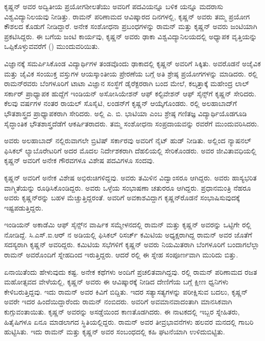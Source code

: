 ಕೃಷ್ಣನ್ ಅವರ ಅದ್ವಿತೀಯ ಪ್ರಯೋಗಶೀಲತೆಯು ಅವರಿಗೆ  ಪದವಿಯನ್ನೂ ಬಳಿಕ  ಯನ್ನೂ ಮದರಾಸು ವಿಶ್ವವಿದ್ಯಾನಿಲಯವು ನೀಡಿತ್ತು. ರಾಮನ್ ಪರಿಣಾಮದ ಆವಿಷ್ಕಾರದ ದಿನಗಳಲ್ಲಿ, ಕೃಷ್ಣನ್ ಅವರು ತಮ್ಮ ಪ್ರಯೋಗ ಕೌಶಲದ ಕೊಡುಗೆ ನೀಡಿದ್ದಾರೆ. ಅನೇಕ ಸಂಶೋಧನಾ ಪ್ರಬಂಧಗಳನ್ನು ರಾಮನ್ ಮತ್ತು ಕೃಷ್ಣನ್ ಅವರು ಜಂಟಿಯಾಗಿ ಪ್ರಕಟಿಸಿದ್ದರು. ಈ ಬಗೆಯ ಜಂಟಿ ಕಾರ್ಯವು, ಕೃಷ್ಣನ್ ಅವರು ಢಾಕಾ ವಿಶ್ವವಿದ್ಯಾನಿಲಯದಲ್ಲಿ ಅಧ್ಯಾಪಕ ವೃತ್ತಿಯನ್ನು ಒಪ್ಪಿಕೊಳ್ಳುವವರೆಗೆ () ಮುಂದುವರಿಯಿತು.

ವಿಜ್ಞಾನಕ್ಕೆ ಸಮರ್ಪಿಸಿಕೊಂಡ ವಿದ್ಯಾರ್ಥಿಗಳ ತಂಡವೊಂದು ಢಾಕಾದಲ್ಲಿ ಕೃಷ್ಣನ್ ಅವರಿಗೆ ಸಿಕ್ಕಿತು. ಅವರೊಡನೆ ಅಜೈವಿಕ ಮತ್ತು ಜೈವಿಕ ಸಂಯುಕ್ತ ವಸ್ತುಗಳ ಆಯಸ್ಕಾಂತೀಯ ಪ್ರೇರಣೆಯ ಬಗ್ಗೆ ಅತಿ ಶ್ರೇಷ್ಠ ಪ್ರಯೋಗಗಳನ್ನು ಮಾಡಿದರು. ರಲ್ಲಿ ರಾಮನ್‍ರವರು ಬೆಂಗಳೂರಿಗೆ ಟಾಟಾ ವಿಜ್ಞಾನ ಸಂಸ್ಥೆಗೆ ಡೈರೆಕ್ಟರರಾಗಿ ಬಂದ ಮೇಲೆ, ಕಲ್ಕತ್ತಾಕ್ಕೆ ಮಹೇಂದ್ರ ಲಾಲ್ ಸರ್ಕಾರ್ ಪ್ರಾಧ್ಯಾಪಕ ಹುದ್ದೆಗೆ ಇಂಡಿಯನ್ ಅಸೋಸಿಯೇಶನ್ ಆಫ್ ಕಲ್ಟಿವೇಶನ್ ಆಫ್ ಸೈನ್ಸ್‌ಗೆ ಕೃಷ್ಣನ್ ಸೇರಿದರು. ಕೆಲವು ವರ್ಷಗಳ ನಂತರ ರಾಯಲ್ ಸೊಸೈಟಿ, ಲಂಡನ್‍ಗೆ ಕೃಷ್ಣನ್ ಆಯ್ಕೆಗೊಂಡರು. ರಲ್ಲಿ ಅಲಹಾಬಾದ್‍ಗೆ ಭೌತಶಾಸ್ತ್ರದ ಪ್ರಾಧ್ಯಾಪಕರಾಗಿ ಸೇರಿದರು. ಅಲ್ಲಿ ಎ. ಬಿ. ಭಾಟಿಯಾ ಎಂಬ ಶ್ರೇಷ್ಠ ಗಣಿತಜ್ಞ ವಿದ್ಯಾರ್ಥಿಯೊಡಗೂಡಿ ಸೈದ್ಧಾಂತಿಕ ಭೌತಶಾಸ್ತ್ರದೆಡೆಗೆ ಆಕರ್ಷಿತರಾದರು. ತಮ್ಮ ಸಂಶೋಧನಾ ಸಂಪ್ರದಾಯವನ್ನು ರವರೆಗೆ ಮುಂದುವರಿಸಿದರು.

ಅವರು ಅಲಹಾಬಾದ್ ನಲ್ಲಿರುವಾಗಲೇ ಬ್ರಿಟಿಷ್ ಸರ್ಕಾರವು ಅವರಿಗೆ ನೈಟ್ ಹುಡ್ ನೀಡಿತು. ಅಲ್ಲಿಂದ ನ್ಯಾಷನಲ್ ಫಿಸಿಕಲ್ ಲ್ಯಾಬೊರೇಟರಿಗೆ ಅದರ ಮೊದಲ ನಿರ್ದೇಶಕರಾಗಿ ದೆಹಲಿಯಲ್ಲಿ ಸೇರಿಕೊಂಡರು. ಅವರ ಜೀವಿತಾವಧಿಯಲ್ಲಿ ಕೃಷ್ಣನ್ ಅವರಿಗೆ ಅನೇಕ ಗೌರವಗಳೂ ವಿಶೇಷ ಪದವಿಗಳೂ ಸಂದವು.

ಕೃಷ್ಣನ್ ಅವರಿಗೆ ಅನೇಕ ವಿಶೇಷ ಅಭಿರುಚಿಗಳಿದ್ದವು. ಅವರು ತಮಿಳಿನ ವಿದ್ವಾಂಸರೂ ಆಗಿದ್ದರು. ಅವರು ಹಾಸ್ಯಭರಿತ ವಾಗ್ಮಿತೆಯನ್ನು ರೂಢಿಸಿಕೊಂಡಿದ್ದರು. ಅವರು ಒಳ್ಳೆಯ ಸಂಭಾಷಣಾ ಚತುರರೂ ಆಗಿದ್ದರು. ಪ್ರಧಾನಮಂತ್ರಿ ನೆಹರೂ ಅವರು ಕೃಷ್ಣನ್‍ರನ್ನು ಬಹಳ ಮೆಚ್ಚುತ್ತಿದ್ದರಂತೆ. ಅವರಿಗೆ ಅವಕಾಶವಿದ್ದಾಗ ಕೃಷ್ಣನ್‍ರೊಡನೆ ಸಂಭಾಷಿಸುವುದಕ್ಕೆ ಇಷ್ಟಪಡುತ್ತಿದ್ದರು.

ಇಂಡಿಯನ್ ಅಕಾಡೆಮಿ ಆಫ್ ಸೈನ್ಸ್‌ನ ವಾರ್ಷಿಕ ಸಮ್ಮೇಳನದಲ್ಲಿ ರಾಮನ್ ಮತ್ತು ಕೃಷ್ಣನ್ ಅವರನ್ನು ಒಟ್ಟಿಗೇ ರಲ್ಲಿ ನೋಡಿದ್ದೆ. ಸಿ.ಎಸ್.ಐ.ಆರ್ ನ ಅಡಿಯಲ್ಲಿ ಫಿಸಿಕಲ್ ರಿಸರ್ಚ್ ಕಮಿಟಿಯ ಅಧ್ಯಕ್ಷರಾಗಿದ್ದ ರಾಮನ್ ಅವರ ಜೊತೆಗೆ ಸದಸ್ಯರಾಗಿ ಕೃಷ್ಣನ್ ಅವರಿದ್ದರು. ಕಮಿಟಿಯ ಸಭೆಗಳಿಗೆ ಕೃಷ್ಣನ್ ಅವರು ನಿಯಮಿತರಾಗಿ ಬೆಂಗಳೂರಿಗೆ ಬಂದಾಗಲೆಲ್ಲಾ ರಾಮನ್ ಅವರೊಂದಿಗೆ ಸ್ನೇಹದಿಂದ ಇರುತ್ತಿದ್ದರು. ಆದರೆ ರಲ್ಲಿ ಈ ಸ್ನೇಹ ಸಂಪೂರ್ಣವಾಗಿ ಮುರಿದು ಬಿತ್ತು.

ಏನಾಯಿತೆಂದು ಹೇಳುವುದು ಕಷ್ಟ. ಅನೇಕ ಕಥೆಗಳು ಅಂದಿಗೆ ಪ್ರಚಲಿತವಾಗಿದ್ದವು. ರಲ್ಲಿ ರಾಮನ್ ಪರಿಣಾಮದ ರಜತ ಮಹೋತ್ಸವದ ವೇಳೆಯಲ್ಲಿ, ಕೃಷ್ಣನ್ ಅವರು ಈ ಆವಿಷ್ಕಾರಕ್ಕೆ ನೀಡಿದ ದೇಣಿಗೆಯ ಬಗ್ಗೆ ಕ್ಷೀಣ ಧ್ವನಿಗಳು ಕೇಳಿಬರುತ್ತಿದ್ದವು. ಇದು ರಾಮನ್ ಅವರ ಕಿವಿಗೆ ಬಿದ್ದಿತು. ಇದರ ಸತ್ಯಾಸತ್ಯಗಳನ್ನು ಪರೀಕ್ಷಿಸುವ ಬದಲು, ಕೃಷ್ಣನ್ ಅವರೇ ಇದರ ಹಿಂದೆಯಿದ್ದಾರೆಂದು ರಾಮನ್ ನಂಬಿದರು. ಅವರಿಗೆ ಅವಮಾನವಾದಂತಾಗಿ ಮಾನಸಿಕವಾಗಿ ಕುಗ್ಗುವಂತಾಯಿತು. ಕೃಷ್ಣನ್ ಅವರನ್ನು ಅಸಡ್ಡೆಯಿಂದ ಕಾಣತೊಡಗಿದರು. ಈ ನಾಟಕದಲ್ಲಿ ಇಬ್ಬರ ಸ್ನೇಹಿತರು, ಹಿತೈಷಿಗಳೂ ಏನೂ ಮಾಡಲಾಗದ ಸ್ಥಿತಿಯಲ್ಲಿದ್ದರು. ರಾಮನ್ ಅವರ ತೀವ್ರಭಾವನೆಗಳು ಹಲವರ ಮನದಲ್ಲಿ ಗಾಬರಿ ಹುಟ್ಟಿಸಿತು. ಇದು ರಾಮನ್ ಮತ್ತು ಕೃಷ್ಣನ್ ಅವರ ಸಂಬಂಧದಲ್ಲಿ ಕಹಿ ಘಟನೆಯಾಗಿ ಉಳಿದುಬಿಟ್ಟಿತು.

